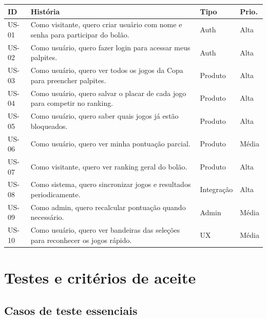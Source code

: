 \documentclass[12pt,a4paper]{article}
\begin{document}
\begin{longtable}{p{}p{}p{}p{}}
\toprule
\textbf{ID} & \textbf{História} & \textbf{Tipo} & \textbf{Prio.} \\
\midrule
US-01 & Como visitante, quero criar usuário com nome e senha para participar do bolão. & Auth & Alta \\
US-02 & Como usuário, quero fazer login para acessar meus palpites. & Auth & Alta \\
US-03 & Como usuário, quero ver todos os jogos da Copa para preencher palpites. & Produto & Alta \\
US-04 & Como usuário, quero salvar o placar de cada jogo para competir no ranking. & Produto & Alta \\
US-05 & Como usuário, quero saber quais jogos já estão bloqueados. & Produto & Alta \\
US-06 & Como usuário, quero ver minha pontuação parcial. & Produto & Média \\
US-07 & Como visitante, quero ver ranking geral do bolão. & Produto & Alta \\
US-08 & Como sistema, quero sincronizar jogos e resultados periodicamente. & Integração & Alta \\
US-09 & Como admin, quero recalcular pontuação quando necessário. & Admin & Média \\
US-10 & Como usuário, quero ver bandeiras das seleções para reconhecer os jogos rápido. & UX & Média \\
\bottomrule
\end{longtable}

\section{Testes e critérios de aceite}

\subsection{Casos de teste essenciais}
\end{document}
